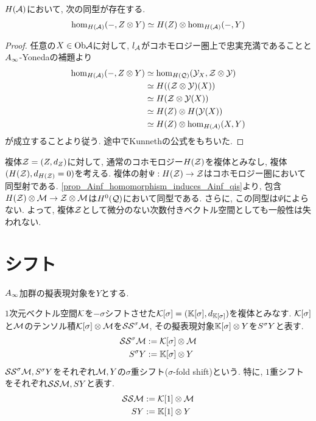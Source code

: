\documentclass[uplatex, a4paper, 14Q, dvipdfmx]{jsarticle}
\begin{document}
\begin{lemma}
  $H(\mathcal{A})$において, 次の同型が存在する. 
  \begin{align*}
    \hom_{H(\mathcal{A})}(-, Z \otimes Y) \simeq H(Z) \otimes \hom_{H(\mathcal{A})}(-,Y)
  \end{align*}
\end{lemma}

\begin{proof}
  任意の$X \in \mathrm{Ob}\mathcal{A}$に対して, $l_{\mathcal{A}}$がコホモロジー圏上で忠実充満であることと$A_{\infty}$-Yonedaの補題より
  \begin{align*}
    \hom_{H(\mathcal{A})}(-, Z \otimes Y)
    &\simeq \hom_{H(\mathcal{Q})}(\mathcal{Y}_X, \mathcal{Z} \otimes \mathcal{Y}) \\
    &\simeq H((\mathcal{Z} \otimes \mathcal{Y})(X)) \\
    &\simeq H(\mathcal{Z} \otimes \mathcal{Y}(X)) \\
    &\simeq H(Z) \otimes H(\mathcal{Y}(X)) \\
    &\simeq H(Z) \otimes \hom_{H(\mathcal{A})}(X,Y)
  \end{align*}
  が成立することより従う. 
  途中でKunnethの公式をもちいた. 
\end{proof}

\begin{remark} \label{rem_tensor_not_depend_on_differential}
  複体$\mathcal{Z} = (Z,d_Z)$に対して, 通常のコホモロジー$H(\mathcal{Z})$を複体とみなし, 複体$(H(\mathcal{Z}), d_{H(\mathcal{Z})}=0)$を考える. 
  複体の射$\Psi : H(\mathcal{Z}) \to \mathcal{Z}$はコホモロジー圏において同型射である. 
  \cref{prop_Ainf_homomorphism_induces_Ainf_qis}より, 包含$H(\mathcal{Z}) \otimes \mathcal{M} \to \mathcal{Z} \otimes \mathcal{M}$は$H^0(\mathcal{Q})$において同型である. 
  さらに, この同型は$\Psi$によらない. 
  よって, 複体$\mathcal{Z}$として微分のない次数付きベクトル空間としても一般性は失われない. 
\end{remark}

\section{シフト}

$A_{\infty}$加群の擬表現対象を$Y$とする. 

\begin{definition}[シフト]
  $1$次元ベクトル空間$\mathcal{K}$を$-\sigma$シフトさせた$\mathcal{K}[\sigma] = (\mathbb{K}[\sigma],d_{\mathbb{K}[\sigma]})$を複体とみなす. 
  $\mathcal{K}[\sigma]$と$\mathcal{M}$のテンソル積$\mathcal{K}[\sigma] \otimes \mathcal{M}$を$\mathcal{SS}^\sigma \mathcal{M}$, その擬表現対象$\mathbb{K}[\sigma] \otimes Y$を$S^\sigma Y$と表す. 
  \begin{align*}
    \mathcal{SS}^\sigma \mathcal{M} &:= \mathcal{K}[\sigma] \otimes \mathcal{M} \\
    S^\sigma Y &:= \mathbb{K}[\sigma] \otimes Y
  \end{align*}
  $\mathcal{SS}^\sigma \mathcal{M}, S^\sigma Y$をそれぞれ$\mathcal{M}, Y$の$\sigma$重シフト($\sigma$-fold shift)という. 
  特に, $1$重シフトをそれぞれ$\mathcal{SS} \mathcal{M}, SY$と表す.
  \begin{align*}
    \mathcal{SS} \mathcal{M} &:= \mathcal{K}[1] \otimes \mathcal{M} \\
    SY &:= \mathbb{K}[1] \otimes Y
  \end{align*} 
\end{definition}
\end{document}
